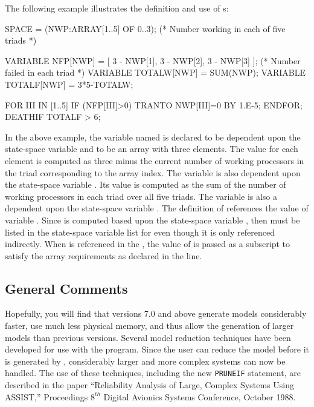 The following example
illustrates the definition and use of s:
\begin{codeexample}
SPACE = (NWP:ARRAY[1..5] OF 0..3); (* Number working in each of five triads *)

VARIABLE NFP[NWP] = [
                       3 - NWP[1],
                       3 - NWP[2],
                       3 - NWP[3]
                    ];    (* Number failed in each triad *)
VARIABLE TOTALW[NWP] = SUM(NWP);
VARIABLE TOTALF[NWP] = 3*5-TOTALW;

FOR III IN [1..5]
   IF (NFP[III]>0) TRANTO NWP[III]=0 BY 1.E-5;
ENDFOR;
DEATHIF TOTALF > 6;
\end{codeexample}
In the above example, the variable named  is declared
to be dependent upon the state-space variable  and to be an array
with three elements.   The value for each element is
computed as three minus the current number of
working processors in the triad corresponding to the array index.
The variable  is also dependent upon the state-space
variable .   Its value is
computed as the sum of the number of working processors in each triad
over all five triads.   The variable  is also
a dependent upon the state-space variable .
The definition of  references the value of variable
.   Since  is computed based upon the state-space
variable , then  must be listed in the state-space
variable list for  even though it is only referenced
indirectly.   When  is referenced in the , the value of
 is passed as a subscript to satisfy the array requirements
as declared in the  line.


\subsection{General Comments}
 
Hopefully, you will find that  versions 7.0 and above 
generate models considerably faster, use much less physical memory, 
and thus allow the generation of larger models than previous versions.
Several model reduction techniques have been
developed for use with the  program.  Since the user can reduce the
model before it is generated by , considerably larger and more complex
systems can now be handled.  The use of these techniques, including the new
\verb'PRUNEIF' statement, are described in the paper ``Reliability
Analysis of Large, Complex Systems Using ASSIST,'' Proceedings $8^{th}$ Digital
Avionics Systems Conference, October 1988.

